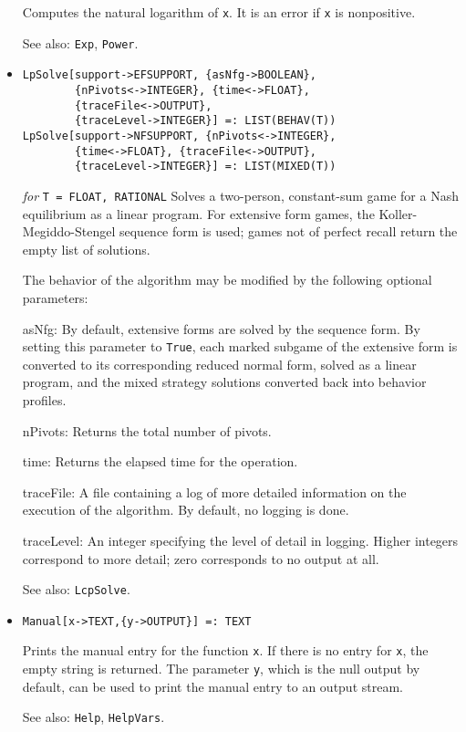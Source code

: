 \begin{itemize}
\bd
Computes the natural logarithm of \verb+x+.  It is an error if
\verb+x+ is nonpositive.
\item [See also:] \verb+Exp+, \verb+Power+.
\ed

\item{}
\protect \large \begin{verbatim}
LpSolve[support->EFSUPPORT, {asNfg->BOOLEAN},
        {nPivots<->INTEGER}, {time<->FLOAT},
        {traceFile<->OUTPUT},
        {traceLevel->INTEGER}] =: LIST(BEHAV(T))
LpSolve[support->NFSUPPORT, {nPivots<->INTEGER},
        {time<->FLOAT}, {traceFile<->OUTPUT},
        {traceLevel->INTEGER}] =: LIST(MIXED(T))
\end{verbatim}\normalsize

{\it for} {\tt T = FLOAT, RATIONAL}
\bd
Solves a two-person, constant-sum game for a Nash equilibrium as a linear
program.  For extensive form games, the Koller-Megiddo-Stengel
sequence form is used; games not of perfect recall return the empty
list of solutions.

The behavior of the algorithm may be modified by the following optional
parameters:
\bd
\item
[asNfg:] By default, extensive forms are solved by the sequence form.
By setting this parameter to \verb+True+, each marked subgame of the
extensive form is converted to its corresponding reduced normal form,
solved as a linear program, and the mixed strategy solutions converted back
into behavior profiles.
\item
[nPivots:] Returns the total number of pivots.
\item
[time:] Returns the elapsed time for the operation.
\item
[traceFile:] A file containing a log of more detailed information on the
execution of the algorithm.  By default, no logging is done.
\item
[traceLevel:] An integer specifying the level of detail in logging.
Higher integers correspond to more detail; zero corresponds to no
output at all.
\ed
\item [See also:] \verb+LcpSolve+.
\ed


\item{}
\protect \large \begin{verbatim}
Manual[x->TEXT,{y->OUTPUT}] =: TEXT
\end{verbatim} \normalsize

\bd 
Prints the manual entry for the function \verb+x+.  If there is no
entry for \verb+x+, the empty string is returned. The parameter
\verb+y+, which is the null output by default, can be used to print
the manual entry to an output stream.
\item [See also:] \verb+Help+, \verb+HelpVars+.
\ed


\end{itemize}
